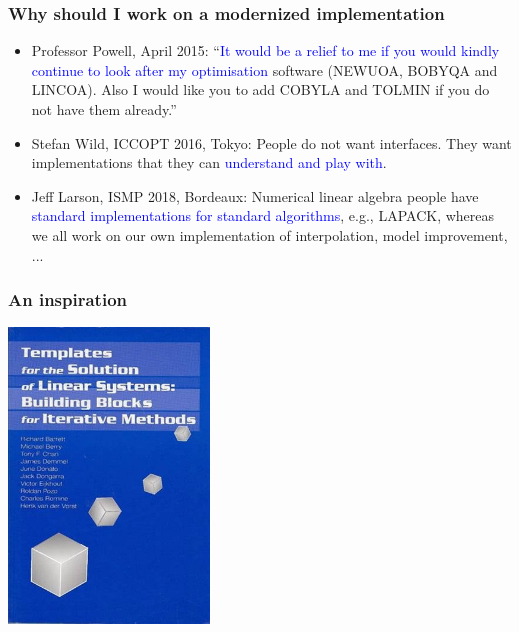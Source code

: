 \documentclass[slidestop,mathserif,xcolor=dvipsnames]{beamer}
\newcommand{\blue}[1]{\textcolor{blue}{#1}}
\begin{document}
\begin{frame}
    \frametitle{Why should \textbf{\textrm{I}} work on a modernized implementation}

            \vspace{2ex}
    \begin{itemize}
        \item Professor Powell, April 2015: ``\blue{It would be a relief to me if you would kindly continue
            to look after my optimisation} software (NEWUOA, BOBYQA and LINCOA). Also I would like
            you to add COBYLA and TOLMIN if you do not have them already.''
            \vspace{1ex}
        \item Stefan Wild, ICCOPT 2016, Tokyo: People do not want interfaces. They want
            implementations that they can \blue{understand and play with}.
            \vspace{1ex}
        \item Jeff Larson, ISMP 2018, Bordeaux: Numerical linear algebra people have \blue{standard
            implementations for standard algorithms}, e.g., LAPACK, whereas we all work on our own
            implementation of interpolation, model improvement, ...
    \end{itemize}
\end{frame}

\begin{frame}
    \frametitle{An inspiration}

    \begin{center}
        \includegraphics[width=0.4\textwidth]{linalg.jpg}
    \end{center}

\end{frame}
\end{document}
